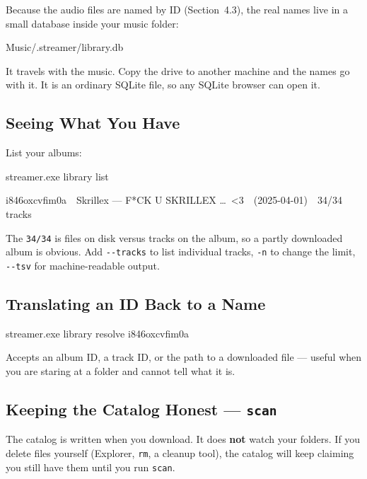 \documentclass[11pt,a4paper]{article}
\begin{document}
Because the audio files are named by ID (Section~4.3), the real names live in
a small database inside your music folder:

\begin{cmdbox}
Music/.streamer/library.db
\end{cmdbox}

It travels with the music.  Copy the drive to another machine and the names go
with it.  It is an ordinary SQLite file, so any SQLite browser can open it.

\subsection{Seeing What You Have}

List your albums:

\begin{cmdbox}
streamer.exe library list
\end{cmdbox}

\begin{cmdbox}
i846oxcvfim0a~~Skrillex --- F*CK U SKRILLEX \ldots\ <3~~(2025-04-01)~~34/34 tracks
\end{cmdbox}

The \texttt{34/34} is files on disk versus tracks on the album, so a partly
downloaded album is obvious.  Add \texttt{-{}-tracks} to list individual
tracks, \texttt{-n} to change the limit, \texttt{-{}-tsv} for machine-readable
output.

\subsection{Translating an ID Back to a Name}

\begin{cmdbox}
streamer.exe library resolve i846oxcvfim0a
\end{cmdbox}

Accepts an album ID, a track ID, or the path to a downloaded file --- useful
when you are staring at a folder and cannot tell what it is.

\subsection{Keeping the Catalog Honest --- \texttt{scan}}

\begin{warnbox}
The catalog is written when you download.  It does \textbf{not} watch your
folders.  If you delete files yourself (Explorer, \texttt{rm}, a cleanup
tool), the catalog will keep claiming you still have them until you run
\texttt{scan}.
\end{warnbox}
\end{document}
